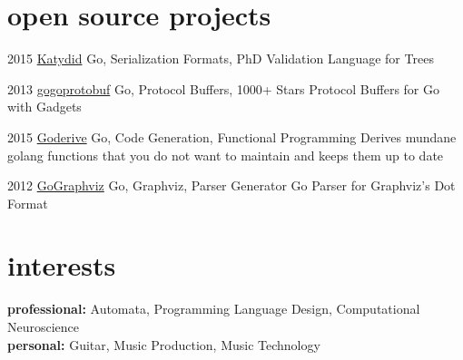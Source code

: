 \documentclass[]{friggeri-cv} %
\begin{document}
\section{open source projects}


\begin{entrylist}

\entry
{2015}
{\href{https://github.com/katydid/katydid}{Katydid}}
{Go, Serialization Formats, PhD}
{Validation Language for Trees}

\entry
{2013}
{\href{https://github.com/gogo/protobuf}{gogoprotobuf}}
{Go, Protocol Buffers, 1000+ Stars}
{Protocol Buffers for Go with Gadgets}

\entry
{2015}
{\href{https://github.com/awalterschulze/goderive}{Goderive}}
{Go, Code Generation, Functional Programming}
{Derives mundane golang functions that you do not want to maintain and keeps them up to date}

\entry
{2012}
{\href{https://github.com/awalterschulze/gographviz}{GoGraphviz}}
{Go, Graphviz, Parser Generator}
{Go Parser for Graphviz's Dot Format}

\end{entrylist}

\section{interests}

\textbf{professional:} Automata, Programming Language Design, Computational Neuroscience \\
\textbf{personal:} Guitar, Music Production, Music Technology
\end{document}
